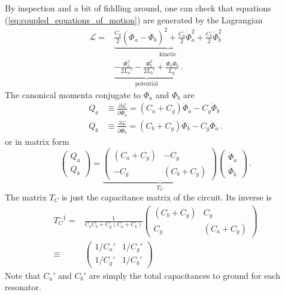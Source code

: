 By inspection and a bit of fiddling around, one can check that equations (\ref{eq:coupled_equations_of_motion}) are generated by the Lagrangian
\begin{align}
  \mathcal{L}
  =& \underbrace{\frac{C_g}{2} \left(\dot \Phi_a - \dot \Phi_b \right)^2
   + \frac{C_a}{2} \dot \Phi_a^2 + \frac{C_b}{2} \dot \Phi_b^2}_\text{kinetic} \nonumber \\
  & \underbrace{- \frac{\Phi_a^2}{2 L_a'} - \frac{\Phi_b^2}{2 L_b'} + \frac{\Phi_a \Phi_b}{L_g'}}_\text{potential} \, .
  \label{eq:coupled_oscillators_lagrangian} %
\end{align}
The canonical momenta conjugate to $\Phi_a$ and $\Phi_b$ are
\begin{align*}
  Q_a & \equiv \frac{\partial \mathcal{L}}{\partial \dot \Phi_a} = (C_a + C_g) \dot \Phi_a - C_g \dot \Phi_b \\
  Q_b & \equiv \frac{\partial \mathcal{L}}{\partial \dot \Phi_b} = (C_b + C_g) \dot \Phi_b - C_g \dot \Phi_a
  \, .
\end{align*}
or in matrix form
\begin{equation*}
  \begin{pmatrix} Q_a \\ Q_b \end{pmatrix}
  =
  \underbrace{
    \begin{pmatrix}
       (C_a + C_g) & -C_g \\
       -C_g & (C_b + C_g)
    \end{pmatrix}
  }_{T_C}
  \begin{pmatrix} \dot \Phi_a \\ \dot \Phi_b \end{pmatrix}
  \, .
\end{equation*}
The matrix $T_C$ is just the capacitance matrix of the circuit.
Its inverse is
\begin{align*}
  T_C^{-1} =& \frac{1}{C_a C_b + C_g (C_a + C_b)}
  \begin{pmatrix}
    (C_b + C_g) & C_g \\
    C_g & (C_a + C_g)
  \end{pmatrix} \\
  \equiv& \begin{pmatrix}
    1 / C_a' & 1 / C_g' \\
    1 / C_g' & 1 / C_b'
  \end{pmatrix}
\end{align*}
Note that $C_a'$ and $C_b'$ are simply the total capacitances to ground for each resonator.

